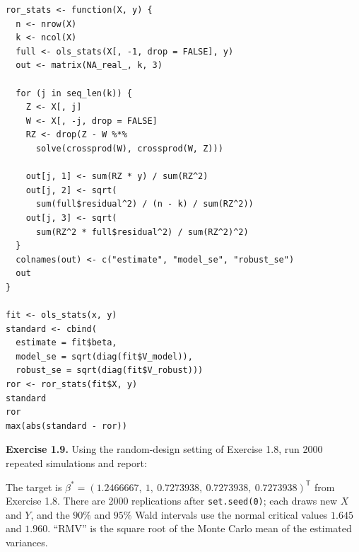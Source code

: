 \documentclass[answers,12pt,addpoints]{exam}
\newcommand{\trans}{^{\mathsf T}}
\begin{document}
\begin{questions}
\begin{solution}
\begin{lstlisting}
ror_stats <- function(X, y) {
  n <- nrow(X)
  k <- ncol(X)
  full <- ols_stats(X[, -1, drop = FALSE], y)
  out <- matrix(NA_real_, k, 3)
 
  for (j in seq_len(k)) {
    Z <- X[, j]
    W <- X[, -j, drop = FALSE]
    RZ <- drop(Z - W %*%
      solve(crossprod(W), crossprod(W, Z)))
 
    out[j, 1] <- sum(RZ * y) / sum(RZ^2)
    out[j, 2] <- sqrt(
      sum(full$residual^2) / (n - k) / sum(RZ^2))
    out[j, 3] <- sqrt(
      sum(RZ^2 * full$residual^2) / sum(RZ^2)^2)
  }
  colnames(out) <- c("estimate", "model_se", "robust_se")
  out
}
 
fit <- ols_stats(x, y)
standard <- cbind(
  estimate = fit$beta,
  model_se = sqrt(diag(fit$V_model)),
  robust_se = sqrt(diag(fit$V_robust)))
ror <- ror_stats(fit$X, y)
standard
ror
max(abs(standard - ror))
\end{lstlisting}
\end{solution}
 
\question \textbf{Exercise 1.9.}
Using the random-design setting of Exercise 1.8, run 2000 repeated
simulations and report:
 
 
\begin{solution}
The target is $\beta^*=(1.2466667,\ 1,\ 0.7273938,\ 0.7273938,\ 0.7273938)\trans$
from Exercise 1.8. There are 2000 replications after \texttt{set.seed(0)}; each draws new $X$ and $Y$, and
the $90\%$ and $95\%$ Wald intervals use the normal critical values $1.645$ and
$1.960$. ``RMV'' is the square root of the Monte Carlo mean of the estimated
variances.
 

\end{solution}
\end{questions}
\end{document}
